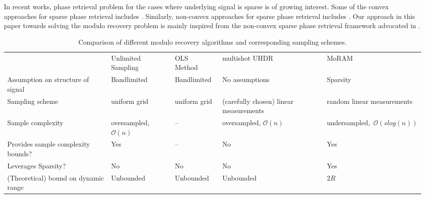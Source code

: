 In recent works, phase retrieval problem for the cases where underlying signal is sparse is of growing interest. Some of the convex approaches for sparse phase retrieval includes \cite{ohlsson2012cprl, li2013sparse,bahmani2015efficient,jaganathan2012recovery}. Similarly, non-convex approaches for sparse phase retrieval includes \cite{netrapalli2013phase, cai2016optimal, wang2016sparse}. Our approach in this paper towards solving the modulo recovery problem is mainly inspired from the non-convex sparse phase retrieval framework advocated in \cite{Jagatap2017}. 



\begin{table*}[t]
	\centering
	\begin{tabular}{|p{4.7cm}|p{3cm}|p{2.2cm}|p{2.6cm}|p{3.2cm}|}
		\cline{1-5}
		& Unlimited Sampling~\cite{Bhandari}& OLS Method~\cite{Cucuringu2018} & multishot UHDR~\cite{ICCP15_Zhao}  & MoRAM \\ \cline{1-5}

		Assumption on structure of signal  & Bandlimited   & Bandlimited &  No assumptions & Sparsity     \\ \cline{1-5}
		Sampling scheme  & uniform grid &  uniform grid  & (carefully chosen) linear measurements   & 
		random linear measurements \\ \cline{1-5}
		Sample complexity & oversampled, $\mathcal{O}(n)$    & --    & oversampled, $\mathcal{O}(n)$   & undersampled,~$\mathcal{O}(slog(n))$ \\ \cline{1-5}
		Provides sample complexity bounds?  & Yes  & --  & No & Yes \\ \cline{1-5}
		Leverages Sparsity?  & No & No   & No    & Yes \\ \cline{1-5}
		(Theoretical) bound on dynamic range    & Unbounded   & Unbounded     & Unbounded   & $2R$  \\ \cline{1-5}                 
	\end{tabular}
\caption{Comparison of different modulo recovery algorithms and corresponding sampling schemes.}
\label{tab:compare}
\end{table*}

